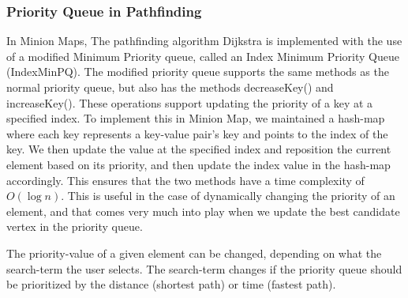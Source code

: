 \subsubsection{Priority Queue in Pathfinding}
In Minion Maps, The pathfinding algorithm Dijkstra is implemented with the use of a modified Minimum Priority queue, called an Index Minimum Priority Queue (IndexMinPQ). The modified priority queue supports the same methods as the normal priority queue, but also has the methods decreaseKey() and increaseKey(). These operations support updating the priority of a key at a specified index. To implement this in Minion Map, we maintained a hash-map where each key represents a key-value pair’s key and points to the index of the key. We then update the value at the specified index and reposition the current element based on its priority, and then update the index value in the hash-map accordingly. This ensures that the two methods have a time complexity of $O(\log{n})$.\cite{PQ/geeksforgeeks} This is useful in the case of dynamically changing the priority of an element, and that comes very much into play when we update the best candidate vertex in the priority queue.\par
The priority-value of a given element can be changed, depending on what the search-term the user selects. The search-term changes if the priority queue should be prioritized by the distance (shortest path) or time (fastest path).

